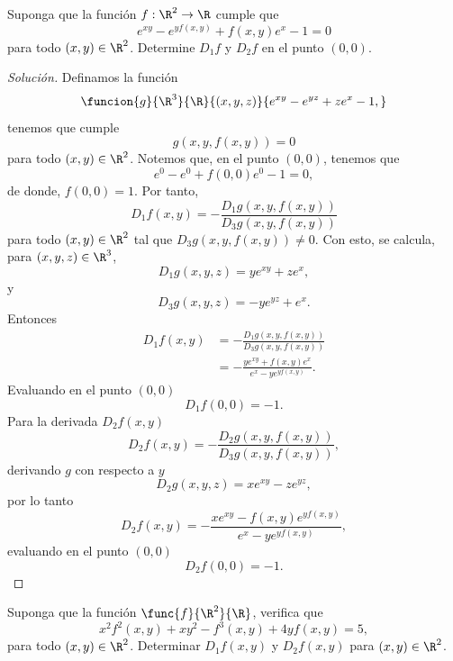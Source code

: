 \documentclass[a4,11pt]{aleph-notas}
\begin{document}
\encabezado

\begin{ejer}
Suponga que la función $f:\R^2 \rightarrow \R$ cumple que
    \[
        e^{xy}-e^{yf(x,y)}+f(x,y)e^x-1=0
    \]
    para todo $(x,y)\in \R^2$. Determine $D_1f$ y $D_2f$ en el punto $(0,0)$.
\end{ejer}

\begin{proof}[Solución]
Definamos la función
    \[
        \funcion{g}{\R^3}{\R}{(x,y,z)}{e^{xy}-e^{yz}+ze^x-1,}
    \]
    tenemos que cumple
    \[
        g(x,y,f(x,y))=0
    \]
	para todo $(x,y)\in \R^2$. Notemos que, en el punto $(0,0)$, tenemos que
	\[
	    e^{0}-e^{0}+f(0,0)e^0-1=0,
    \]	
    de donde, $f(0,0)=1$. Por tanto,
	\[
        D_1f(x,y)=-\frac{D_1g(x,y,f(x,y))}{D_3g(x,y,f(x,y))}	
    \]
	para todo $(x,y)\in \R^2$ tal que $D_3g(x,y,f(x,y))\neq 0$. Con esto,  se calcula, para $(x,y,z)\in \R^3$,
	\[
        D_1g(x,y,z)=ye^{xy}+ze^x,
	\]
	y
	\[
	    D_3g(x,y,z)=-ye^{yz}+e^x.
	\]      
	Entonces 
	\begin{align*}
	    D_1f(x,y)
	    & =-\frac{D_1g(x,y,f(x,y))}{D_3g(x,y,f(x,y))}\\
		& =-\frac{ye^{xy}+f(x,y)e^x}{e^x-ye^{yf(x,y)}}.
	\end{align*}
	Evaluando en el punto $(0,0)$
	\[
        D_1f(0,0)=-1.
    \]
	Para la derivada $D_2f(x,y)$
	\[
	    D_2f(x,y)=-\frac{D_2g(x,y,f(x,y))}{D_3g(x,y,f(x,y))},
    \]
	derivando $g$ con respecto a $y$
	\[
        D_2g(x,y,z)=xe^{xy}-ze^{yz},
    \]
	por lo tanto 
	\[
        D_2f(x,y)=-\frac{xe^{xy}-f(x,y)e^{yf(x,y)}}{e^x-ye^{yf(x,y)}},
    \]
	evaluando en el punto $(0,0)$
	\[
        D_2f(0,0)=-1.
    \]
\end{proof}

\begin{ejer}
Suponga que la función $\func{f}{\R^2}{\R}$, verifica que
    \[
        x^2 f^2(x, y) + x y^2 - f^3(x, y) + 4 y f(x, y) = 5,
    \]
    para todo $(x, y)\in \R^2$. Determinar $D_1 f(x, y)$ y $D_2 f(x, y)$ para $(x, y)\in \R^2$.
\end{ejer}
\end{document}
